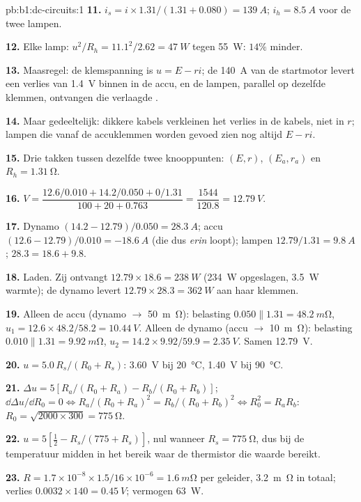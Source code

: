 \begin{solution}{pb:b1:dc-circuits:1}
\textbf{11.} $i_s = i \times 1.31/(1.31 + 0.080) = \qty{139}{A}$; $i_h =
\qty{8.5}{A}$ voor de twee lampen.

\textbf{12.} Elke lamp: $u^2/R_h = 11.1^2/2.62 = \qty{47}{W}$ tegen
\qty{55}{W}: $14\%$ minder.

\textbf{13.} Maasregel: de klemspanning is $u = E - ri$; de
\qty{140}{A} van de startmotor levert een verlies van \qty{1.4}{V} binnen in de accu,
en de lampen, parallel op dezelfde klemmen, ontvangen die verlaagde
.

\textbf{14.} Maar gedeeltelijk: dikkere kabels verkleinen het verlies in de kabels,
niet in $r$; lampen die vanaf de accuklemmen worden gevoed zien nog altijd $E - ri$.

\textbf{15.} Drie takken tussen dezelfde twee knooppunten: $(E, r)$,
$(E_a, r_a)$ en $R_h = \qty{1.31}{\ohm}$.

\textbf{16.} $V = \dfrac{12.6/0.010 + 14.2/0.050 + 0/1.31}{100 + 20 + 0.763}
= \dfrac{1544}{120.8} = \qty{12.79}{V}$.

\textbf{17.} Dynamo $(14.2 - 12.79)/0.050 = \qty{28.3}{A}$; accu
$(12.6 - 12.79)/0.010 = \qty{-18.6}{A}$ (die dus \emph{erin} loopt); lampen
$12.79/1.31 = \qty{9.8}{A}$; $28.3 = 18.6 + 9.8$.

\textbf{18.} Laden. Zij ontvangt $12.79 \times 18.6 = \qty{238}{W}$
(\qty{234}{W} opgeslagen, \qty{3.5}{W} warmte); de dynamo levert
$12.79 \times 28.3 = \qty{362}{W}$ aan haar klemmen.

\textbf{19.} Alleen de accu (dynamo $\to$ \qty{50}{m\ohm}): belasting
$0.050 \parallel 1.31 = \qty{48.2}{m\ohm}$, $u_1 = 12.6 \times 48.2/58.2 =
\qty{10.44}{V}$. Alleen de dynamo (accu $\to$ \qty{10}{m\ohm}): belasting
$0.010 \parallel 1.31 = \qty{9.92}{m\ohm}$, $u_2 = 14.2 \times 9.92/59.9 =
\qty{2.35}{V}$. Samen \qty{12.79}{V}.

\textbf{20.} $u = 5.0\,R_s/(R_0 + R_s)$: \qty{3.60}{V} bij
\qty{20}{\degreeCelsius}, \qty{1.40}{V} bij \qty{90}{\degreeCelsius}.

\textbf{21.} $\Delta u = 5[R_a/(R_0 + R_a) - R_b/(R_0 + R_b)]$;
$\dd\Delta u/\dd R_0 = 0 \Leftrightarrow R_a/(R_0 + R_a)^2 = R_b/(R_0 +
R_b)^2 \Leftrightarrow R_0^2 = R_aR_b$: $R_0 = \sqrt{2000 \times 300} =
\qty{775}{\ohm}$.

\textbf{22.} $u = 5[\tfrac12 - R_s/(775 + R_s)]$, nul wanneer $R_s =
\qty{775}{\ohm}$, dus bij de temperatuur midden in het bereik waar de
thermistor die waarde bereikt.

\textbf{23.} $R = 1.7\times10^{-8} \times 1.5/16\times10^{-6} =
\qty{1.6}{m\ohm}$ per geleider, \qty{3.2}{m\ohm} in totaal; verlies $0.0032
\times 140 = \qty{0.45}{V}$; vermogen \qty{63}{W}.


\end{solution}
